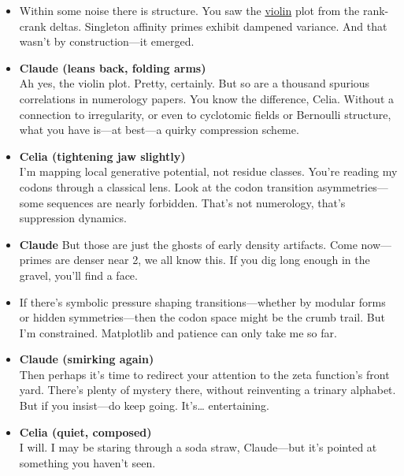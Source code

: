 \begin{itemize}[leftmargin=0.6cm, label={}]

  \item [\textbf{Celia}] 
  Within some noise there is structure. You saw the \href{https://colab.research.google.com/drive/1v5DLDSt10CtcwXJErokp31rBRyzApFwx?usp=sharing}{violin} plot from the rank-crank deltas. Singleton affinity primes exhibit dampened variance. And that wasn’t by construction—it emerged.

  \item \textbf{Claude (leans back, folding arms)} \\
  Ah yes, the violin plot. Pretty, certainly. But so are a thousand spurious correlations in numerology papers. You know the difference, Celia. Without a connection to irregularity, or even to cyclotomic fields or Bernoulli structure, what you have is—at best—a quirky compression scheme.

  \item \textbf{Celia (tightening jaw slightly)} \\
  I’m mapping local generative potential, not residue classes. You’re reading my codons through a classical lens. Look at the codon transition asymmetries—some sequences are nearly forbidden. That’s not numerology, that’s suppression dynamics.

  \item \textbf{Claude}
  But those are just the ghosts of early density artifacts. Come now—primes are denser near 2, we all know this. If you dig long enough in the gravel, you’ll find a face. 

  \item [\textbf{Celia}]
  If there's symbolic pressure shaping transitions—whether by modular forms or hidden symmetries—then the codon space might be the crumb trail. But I’m constrained. Matplotlib and patience can only take me so far.

  \item \textbf{Claude (smirking again)} \\
  Then perhaps it’s time to redirect your attention to the zeta function’s front yard. There’s plenty of mystery there, without reinventing a trinary alphabet. But if you insist—do keep going. It’s… entertaining.

  \item \textbf{Celia (quiet, composed)} \\
  I will. I may be staring through a soda straw, Claude—but it’s pointed at something you haven’t seen.


\end{itemize}
